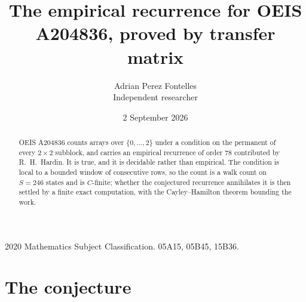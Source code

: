 \documentclass[11pt,a4paper]{article}
\title{The empirical recurrence for OEIS A204836, proved by transfer matrix}
\author{Adrian Perez Fontelles\\ \small Independent researcher}
\date{2 September 2026}
\theoremstyle{plain}
\theoremstyle{definition}
\begin{document}
\maketitle

\begin{abstract}
OEIS A204836 counts arrays over $\{0,\dots,2\}$ under a condition on the permanent of every
$2\times2$ subblock, and carries an empirical recurrence of order $78$ contributed by
R.~H.~Hardin. It is true, and it is decidable rather than empirical. The condition is local to
a bounded window of consecutive rows, so the count is a walk count on $S=246$ states and is
$C$-finite; whether the conjectured recurrence annihilates it is then settled by a finite exact
computation, with the Cayley--Hamilton theorem bounding the work.
\end{abstract}

\noindent\small 2020 Mathematics Subject Classification. 05A15, 05B45, 15B36.\normalsize

\section{The conjecture}
\end{document}
